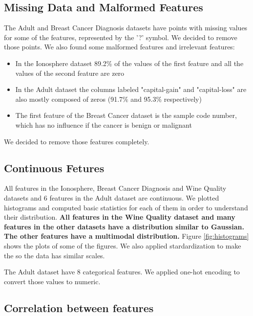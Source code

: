 \documentclass{article}
\begin{document}
\subsection{Missing Data and Malformed Features}

The Adult and Breast Cancer Diagnosis datasets have points with missing values for some of the features, represented by the '?' symbol. We decided to remove those points. We also found some malformed features and irrelevant features:

\begin{itemize}
    \item In the Ionosphere dataset 89.2\% of the values of the first feature and all the values of the second feature are zero
    \item In the Adult dataset the columns labeled "capital-gain" and "capital-loss" are also mostly composed of zeros (91.7\% and 95.3\% respectively)
    \item The first feature of the Breast Cancer dataset is the sample code number, which has no influence if the cancer is benign or malignant
\end{itemize}

We decided to remove those features completely.

\subsection{Continuous Fetures}

All features in the Ionosphere, Breast Cancer Diagnosis and Wine Quality datasets and 6 features in the Adult dataset are continuous. We plotted histograms and computed basic statistics for each of them in order to understand their distribution. \textbf{All features in the Wine Quality dataset and many features in the other datasets have a distribution similar to Gaussian. The other features have a multimodal distribution.} Figure \ref{fig:histograms} shows the plots of some of the figures. We also applied stardardization to make the so the data has similar scales.


The Adult dataset have 8 categorical features. We applied one-hot encoding to convert those values to numeric.

\subsection{Correlation between features}
\end{document}
